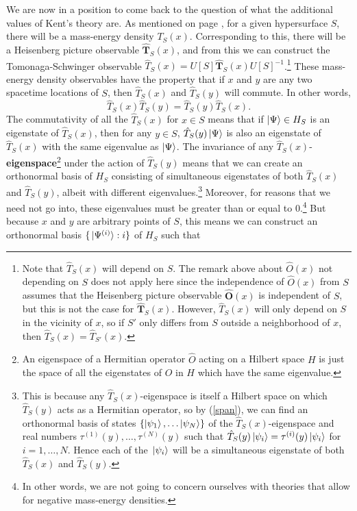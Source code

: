 We are now in a position to come back to the question of what the additional values of Kent's theory are. As mentioned on page \pageref{massenergydensity}, for a given hypersurface $S$,  there will be a mass-energy density $T_S(x)$. Corresponding to this, there will be a Heisenberg picture observable $\hat{\bm{T}}_S(x)$, and from this we can construct the Tomonaga-Schwinger observable $\hat{T}_S(x)=U[S]\hat{\bm{T}}_S(x)U[S]^{-1}$.\footnote{Note that $\hat{T}_S(x)$ will depend on $S$. The remark above about $\hat{O}(x)$ not depending on $S$ does not apply here since the independence of $\hat{O}(x)$ from $S$ assumes that the Heisenberg picture observable $\hat{\bm{O}}(x)$ is independent of $S$, but this is not the case for  $\hat{\bm{T}}_S(x)$. However,  $\hat{T}_S(x)$ will only depend on $S$ in the vicinity of $x$, so if $S'$ only differs from $S$ outside a neighborhood of $x$, then $\hat{T}_S(x) =\hat{T}_{S'}(x)$.} These mass-energy density observables have the property that if $x$ and $y$ are any two spacetime locations of $S$, then $\hat{T}_S(x)$ and $\hat{T}_S(y)$ will commute. In other words,
$$\hat{T}_S(x)\hat{T}_S(y)=\hat{T}_S(y)\hat{T}_S(x).$$
The commutativity of all the $\hat{T}_S(x)$ for $x\in S$ means that if $\ket{\Psi}\in H_S$ is an eigenstate of $\hat{T}_S(x)$, then for any $y\in S$, $\hat{T}_S(y)\ket{\Psi}$ is also an eigenstate of  $\hat{T}_S(x)$ with the same eigenvalue as $\ket{\Psi}$. The invariance of any $\hat{T}_S(x)$-\textbf{eigenspace}\footnote{An eigenspace of a Hermitian operator $\hat{O}$ acting on a Hilbert space $H$ is just the space of all the eigenstates of $\hat{O}$ in $H$ which have the same eigenvalue.} under the action of   $\hat{T}_S(y)$ means that we can create an orthonormal basis of $H_S$ consisting of simultaneous eigenstates of both  $\hat{T}_S(x)$ and  $\hat{T}_S(y)$, albeit with different eigenvalues.\footnote{This is because any $\hat{T}_S(x)$-eigenspace is itself a Hilbert space on which $\hat{T}_S(y)$ acts as a Hermitian operator, so by (\ref{span}), we can find an orthonormal basis of states $\{\ket{\psi_1},\ldots\ket{\psi_N}\}$ of the $\hat{T}_S(x)$-eigenspace and real numbers $\tau^{(1)}(y),\ldots,\tau^{(N)}(y)$ such that $\hat{T}_S(y)\ket*{\psi_i}=\tau^{(i)}(y)\ket*{\psi_i}$ for $i=1,\ldots,N.$ Hence each of the $\ket*{\psi_i}$ will be a simultaneous eigenstate of both $\hat{T}_S(x)$ and $\hat{T}_S(y)$.} Moreover, for reasons that we need not go into, these eigenvalues must be greater than or equal to $0$.\footnote{In other words, we are not going to concern ourselves with theories that allow for negative mass-energy densities.} But because $x$ and $y$ are arbitrary points of $S$, this means  we can construct an orthonormal basis $\{\ket*{\Psi^{(i)}}:i\}$ of $H_S$ such that
